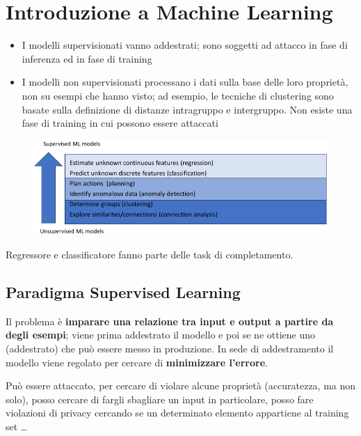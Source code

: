 \documentclass{report}
\begin{document}
\section{Introduzione a Machine Learning}

\begin{itemize}
    \item I modelli supervisionati vanno addestrati; sono soggetti ad attacco in fase di inferenza ed in fase di training
    \item I modelli non supervisionati processano i dati sulla base delle loro proprietà, non su esempi che hanno visto; ad esempio, 
    le tecniche di clustering sono basate sulla definizione di distanze intragruppo e intergruppo. Non esiste una 
    fase di training in cui possono essere attaccati
\end{itemize}

\begin{figure}[H]
    \centering
    \includegraphics[width=1\linewidth]{images/intro-ml.png}
\end{figure}

\noindent Regressore e classificatore fanno parte delle task di completamento.

\subsection{Paradigma Supervised Learning}
Il problema è \textbf{imparare una relazione tra input e output a partire da degli esempi}; viene prima addestrato il modello e poi se ne ottiene uno (addestrato)
che può essere messo in produzione. In sede di addestramento il modello viene regolato per cercare di \textbf{minimizzare l'errore}.

\noindent Può essere attaccato, per cercare di violare alcune proprietà (accuratezza, ma non solo), posso cercare di fargli sbagliare un input in 
particolare, posso fare violazioni di privacy cercando se un determinato elemento appartiene al training set \dots
\end{document}
